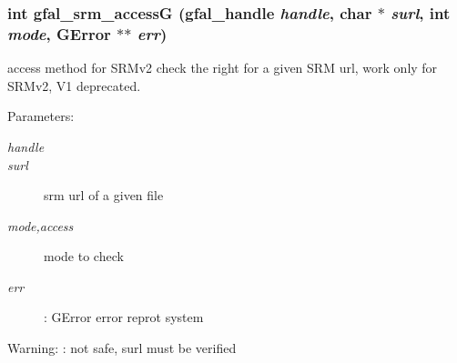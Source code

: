 \subsubsection{\setlength{\rightskip}{0pt plus 5cm}int gfal\_\-srm\_\-access\-G (gfal\_\-handle {\em handle}, char $\ast$ {\em surl}, int {\em mode}, GError $\ast$$\ast$ {\em err})}\label{gfal__common__srm__access_8h_e32a5d03243ee2f17e43fadc4c421612}


access method for SRMv2 check the right for a given SRM url, work only for SRMv2, V1 deprecated. 

\begin{Desc}
\item[Parameters:]
\begin{description}
\item[{\em handle}]\item[{\em surl}]srm url of a given file \item[{\em mode,access}]mode to check \item[{\em err}]: GError error reprot system \end{description}
\end{Desc}
\begin{Desc}
\item[Warning:]: not safe, surl must be verified \end{Desc}
